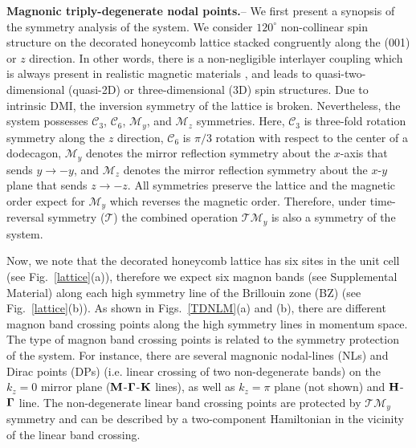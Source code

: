 \documentclass[doublecol]{epl2}
\begin{document}
   
 \textbf{Magnonic triply-degenerate nodal points.}--
  We first present a synopsis of the symmetry analysis of the system.   We consider  $120^\circ$ non-collinear spin structure on the decorated honeycomb lattice stacked congruently  along the (001) or $z$ direction. In other words, there is a non-negligible interlayer coupling which is always present in realistic magnetic materials \cite{zheng}, and leads to quasi-two-dimensional (quasi-2D) or three-dimensional (3D) spin structures. Due to intrinsic  DMI, the inversion symmetry of the lattice is broken. Nevertheless, the system possesses $\mathcal C_{3}$, $\mathcal C_{6}$, $\mathcal M_y$, and $\mathcal M_z$ symmetries. Here, $\mathcal C_{3}$ is three-fold rotation symmetry along the $z$ direction,  $\mathcal C_{6}$ is $\pi/3$ rotation with respect to the center of a dodecagon, $\mathcal M_y$ denotes the mirror reflection symmetry about the $x$-axis that sends $y\to-y$, and $\mathcal M_z$ denotes the mirror reflection symmetry about the $x$-$y$ plane that sends $z\to-z$. All symmetries preserve the lattice and the magnetic order expect for  $\mathcal M_y$ which reverses the magnetic order. Therefore, under time-reversal symmetry ($\mathcal T$) the combined operation $\mathcal T\mathcal M_y$ is also a symmetry of the system. 

Now, we note that the decorated honeycomb lattice has six sites in the unit cell (see Fig.~\ref{lattice}(a)), therefore we expect six magnon bands (see Supplemental Material) along each high symmetry line of the Brillouin zone (BZ) (see Fig.~\ref{lattice}(b)).  As shown in Figs.~\ref{TDNLM}(a) and (b), there are different magnon band crossing points along the high symmetry lines in momentum space.   The type of magnon band crossing points is related to the  symmetry protection  of the system. For instance,  there are several magnonic nodal-lines (NLs) and Dirac points (DPs) (i.e. linear crossing of two non-degenerate bands) on the $k_z=0$  mirror plane (${\bf M}$-${\bf \Gamma}$-${\bf K}$ lines), as well as $k_z=\pi$ plane (not shown) and ${\bf H}$-${\bf \Gamma}$ line.  The non-degenerate linear band crossing points are protected by  $\mathcal T\mathcal M_y$ symmetry and can be described by a two-component Hamiltonian in the vicinity of the linear band crossing. 
\end{document}

